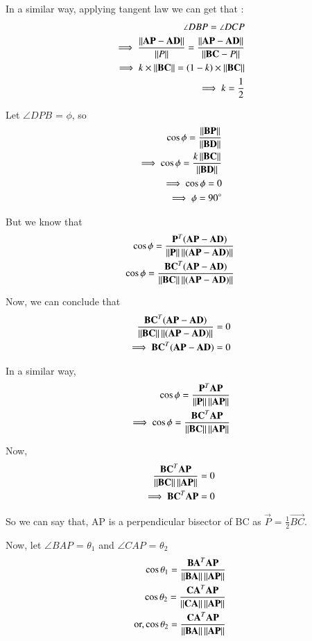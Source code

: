 \documentclass[journal,12pt,twocolumn]{IEEEtran}
\begin{document}
In a similar way, applying tangent law we can get that :
\begin{align}
\angle DBP = \angle DCP\\
\implies \frac{\left\lVert\mathbf{AP}-\mathbf{AD}\right\rVert}{\left\lVert P\right\rVert} = \frac{\left\lVert\mathbf{AP}-\mathbf{AD}\right\rVert}{\left\lVert\mathbf{BC}-P\right\rVert}\\
\implies k \times \left\lVert\mathbf{BC}\right\rVert = (1-k) \times \left\lVert\mathbf{BC}\right\rVert\\
\implies k= \frac{1}{2}
\end{align}

Let $\angle DPB$ = $\phi$, so
\begin{align}
\cos\phi = \frac{\left\lVert\mathbf{BP}\right\rVert}{\left\lVert\mathbf{BD}\right\rVert}\\
\implies \cos\phi = \frac{k \left\lVert\mathbf{BC}\right\rVert}{\left\lVert\mathbf{BD}\right\rVert}\\
\implies \cos\phi = 0\\
\implies \phi = 90 \degree
\end{align}

But we know that 
\begin{align}
\cos\phi = \frac{\mathbf{P}^T (\mathbf{AP} - \mathbf{AD})}{\left\lVert\mathbf{P}\right\rVert\left\lVert(\mathbf{AP} - \mathbf{AD})\right\rVert}\\
\cos\phi = \frac{\mathbf{BC}^T (\mathbf{AP} - \mathbf{AD})}{\left\lVert\mathbf{BC}\right\rVert\left\lVert(\mathbf{AP} - \mathbf{AD})\right\rVert}
\end{align}

Now, we can conclude that 
\begin{align}
\frac{\mathbf{BC}^T (\mathbf{AP} - \mathbf{AD})}{\left\lVert\mathbf{BC}\right\rVert\left\lVert(\mathbf{AP} - \mathbf{AD})\right\rVert} = 0\\
\implies \mathbf{BC}^T (\mathbf{AP} - \mathbf{AD}) = 0
\end{align}

In a similar way,
\begin{align}
\cos\phi = \frac{\mathbf{P}^T \mathbf{AP}}{\left\lVert\mathbf{P}\right\rVert\left\lVert\mathbf{AP}\right\rVert}\\
\implies \cos\phi = \frac{\mathbf{BC}^T \mathbf{AP}}{\left\lVert\mathbf{BC}\right\rVert\left\lVert\mathbf{AP}\right\rVert}\\
\end{align}

Now, 
\begin{align}
\frac{\mathbf{BC}^T \mathbf{AP}}{\left\lVert\mathbf{BC}\right\rVert\left\lVert\mathbf{AP}\right\rVert} = 0\\
\implies \mathbf{BC}^T \mathbf{AP} = 0
\end{align}

So we can say that, AP is a perpendicular bisector of BC as $\vec{P}$ = $\frac{1}{2} \vec{BC}$.

Now, let $\angle BAP$ = $\theta_1$ and $\angle CAP$ = $\theta_2$
\begin{align}
\cos\theta_1 = \frac{\mathbf{BA}^T \mathbf{AP}}{\left\lVert\mathbf{BA}\right\rVert\left\lVert\mathbf{AP}\right\rVert}\\
\cos\theta_2 = \frac{\mathbf{CA}^T \mathbf{AP}}{\left\lVert\mathbf{CA}\right\rVert\left\lVert\mathbf{AP}\right\rVert}\\
\text{or,}\cos\theta_2 = \frac{\mathbf{CA}^T \mathbf{AP}}{\left\lVert\mathbf{BA}\right\rVert\left\lVert\mathbf{AP}\right\rVert}\\
\end{align}
\end{document}

